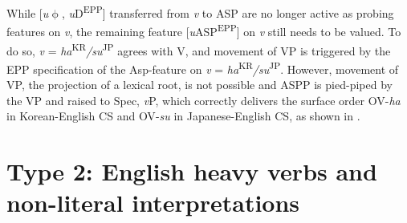 \ea\label{ex:113}
\z

While [\textit{u}$\upphi$, \textit{u}D\textsuperscript{EPP}] transferred from \textit{v} to \ac{ASP} are no longer active as probing features on \textit{v}, the remaining feature [\textit{u}\ac{ASP}\textsuperscript{EPP}] on \textit{v} still needs to be valued. To do so, \textit{v} = \textit{ha}\textsuperscript{KR}\textit{/su}\textsuperscript{JP} agrees with V, and movement of \acs{VP} is triggered by the \ac{EPP} specification of the Asp-feature on \textit{v} = \textit{ha}\textsuperscript{KR}\textit{/su}\textsuperscript{JP}. However, movement of \acs{VP}, the projection of a lexical root, is not possible and \ac{ASP}P is pied-piped by the \acs{VP} and raised to Spec, \textit{v}P, which correctly delivers the surface order \ac{OV}-\textit{ha} in Korean-English \ac{CS} and \ac{OV}-\textit{su} in Japanese-English \ac{CS}, as shown in .

\ea\label{ex:114}
\z

\section{Type 2: English heavy verbs and non-literal interpretations}\label{ch5:sect:5.2}

